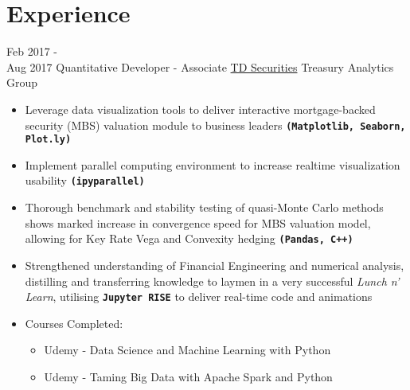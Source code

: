 \documentclass[letterpaper]{twentysecondcv} %
\begin{document}
\makeprofile %

\newcommand{\skill}[1]{\texttt{\textbf{#1}}}


\section{Experience}

\begin{twenty} %

	\twentyitem
    	{Feb 2017 - \\ Aug 2017}
        {Quantitative Developer - Associate}
        {\href{https://www.tdsecurities.com}{TD Securities}}
        {Treasury Analytics Group}
        {
        {\begin{itemize}
		\item Leverage data visualization tools to deliver interactive mortgage-backed security (MBS) valuation module to business leaders \skill{(Matplotlib, Seaborn, Plot.ly)}
		\item Implement parallel computing environment to increase realtime visualization usability \skill{(ipyparallel)}
        \item Thorough benchmark and stability testing of quasi-Monte Carlo methods shows marked increase in convergence speed for MBS valuation model, allowing for Key Rate Vega and Convexity hedging \skill{(Pandas, C++)}
        \item Strengthened understanding of Financial Engineering and numerical analysis, distilling and transferring knowledge to laymen in a very successful \emph{Lunch n' Learn}, utilising \skill{Jupyter RISE} to deliver real-time code and animations
        \item Courses Completed: 
        \begin{itemize}
        	\item Udemy - Data Science and Machine Learning with Python
        	\item Udemy - Taming Big Data with Apache Spark and Python
        \end{itemize}
    \end{itemize}}
        }
        


\end{twenty}
\end{document}
